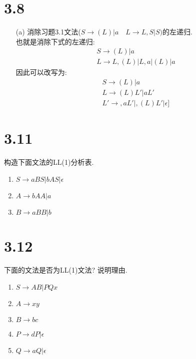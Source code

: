 \documentclass[UTF8]{article}
\begin{document}
\section*{3.8}
\begin{enumerate}
\item[(a) ] 消除习题3.1文法($S\rightarrow (L)|a\quad L\rightarrow L,S|S)$的左递归.\\
	也就是消除下式的左递归:
	$$\begin{array}{l}
	S \rightarrow (L)|a\\
	L \rightarrow L,(L)|L,a|(L)|a
	\end{array}$$
	因此可以改写为:
	$$\begin{array}{l}
	S \rightarrow (L)|a\\
	L \rightarrow (L)L'|aL'\\
	L' \rightarrow ,aL'|,(L)L'|\epsilon]
	\end{array}$$
\end{enumerate}

\section*{3.11}
\noindent 构造下面文法的LL(1)分析表.
\begin{enumerate}
\item $S\rightarrow aBS|bAS|\epsilon$
\item $A\rightarrow bAA|a$
\item $B\rightarrow aBB|b$
\end{enumerate}

\section*{3.12}
\noindent 下面的文法是否为LL(1)文法? 说明理由.
\begin{enumerate}
\item $S \rightarrow AB|PQx$
\item $A \rightarrow xy$
\item $B \rightarrow bc$
\item $P \rightarrow dP|\epsilon$
\item $Q \rightarrow aQ|\epsilon$
\end{enumerate}
\end{document}
